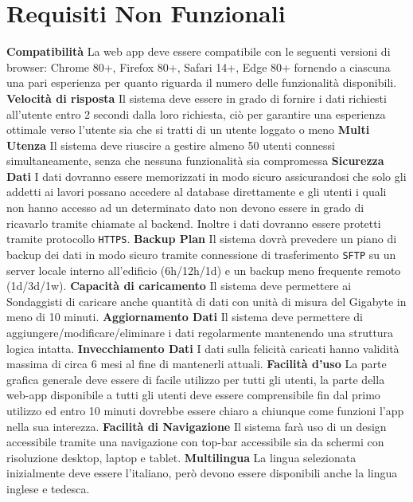 \chapter{Requisiti Non Funzionali} 
\thispagestyle{stdPage}
    \begin{rnfList}
        \rnfItem \textbf{Compatibilità} La web app deve essere compatibile con le seguenti versioni di browser: Chrome 80+, Firefox 80+, Safari 14+, Edge 80+ fornendo a ciascuna una pari esperienza per quanto riguarda il numero delle funzionalità disponibili.
        \rnfItem \textbf{Velocità di risposta} Il sistema deve essere in grado di fornire i dati richiesti all’utente entro 2 secondi dalla loro richiesta, ciò per garantire una esperienza ottimale verso l’utente sia che si tratti di un utente loggato o meno
        \rnfItem \textbf{Multi Utenza} Il sistema deve riuscire a gestire almeno 50 utenti connessi simultaneamente, senza che nessuna funzionalità sia compromessa
        \rnfItem \textbf{Sicurezza Dati} I dati dovranno essere memorizzati in modo sicuro assicurandosi che solo gli addetti ai lavori possano accedere al database direttamente e gli utenti i quali non hanno accesso ad un determinato dato non devono essere in grado di ricavarlo tramite chiamate al backend. Inoltre i dati dovranno essere protetti tramite protocollo \texttt{HTTPS}.
        \rnfItem \textbf{Backup Plan} Il sistema dovrà prevedere un piano di backup dei dati in modo sicuro tramite connessione di trasferimento \texttt{SFTP} su un server locale interno all'edificio (6h/12h/1d) e un backup meno frequente remoto (1d/3d/1w).
        \rnfItem \textbf{Capacità di caricamento} Il sistema deve permettere ai Sondaggisti di caricare anche quantità di dati con unità di misura del Gigabyte in meno di 10 minuti.
        \rnfItem \textbf{Aggiornamento Dati} Il sistema deve permettere di aggiungere/modificare/eliminare i dati regolarmente mantenendo una struttura logica intatta.
        \rnfItem \textbf{Invecchiamento Dati} I dati sulla felicità caricati hanno validità massima di circa 6 mesi al fine di mantenerli attuali.
        \rnfItem \textbf{Facilità d'uso} La parte grafica generale deve essere di facile utilizzo per tutti gli utenti, la parte della web-app disponibile a tutti gli utenti deve essere comprensibile fin dal primo utilizzo ed entro 10 minuti dovrebbe essere chiaro a chiunque come funzioni l'app nella sua interezza.
        \rnfItem \textbf{Facilità di Navigazione} Il sistema farà uso di un design accessibile tramite una navigazione con top-bar accessibile sia da schermi con risoluzione desktop, laptop e tablet.
        \rnfItem \textbf{Multilingua} La lingua selezionata inizialmente deve essere l'italiano, però devono essere disponibili anche la lingua inglese e tedesca.
    \end{rnfList}